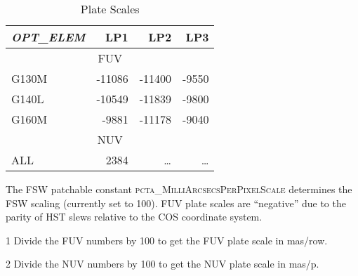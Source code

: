 \begin{table}
\footnotesize
\centering
	\begin{threeparttable}[tbc]
	\caption{ Plate Scales}
	\begin{tabular*}{.8\linewidth}{@{\extracolsep{\fill}}lrrr}
		\toprule
		\textit{OPT\_ELEM} &	LP1	&	LP2	&	LP3	\\
		\midrule
		\multicolumn{4}{c}{FUV\tnote{1}}\\
		\midrule
		G130M &  -11086 &  -11400 &   -9550 \\
		G140L &  -10549 &  -11839 &   -9800 \\
		G160M &   -9881 &  -11178 &   -9040 \\
		\midrule
		\multicolumn{4}{c}{NUV\tnote{2}}\\
		\midrule
			ALL	&	2384	&	\dots	&	\dots \\
		\bottomrule
	\end{tabular*}
	\scriptsize
		\begin{tablenotes}
			\item[] {The FSW patchable constant \textsc{pcta\_MilliArcsecsPerPixelScale} determines the FSW scaling (currently set to 100). FUV plate scales are ``negative'' due to the parity of HST slews relative to the COS coordinate system.\\}
			\item[1] {Divide the FUV numbers by 100 to get the FUV plate scale in mas/row.}
			\item[2] {Divide the NUV numbers by 100 to get the NUV plate scale in mas/p. }
		\end{tablenotes}
	\label{tab:platescales}
	\normalsize
	\end{threeparttable}
\normalsize
\end{table}
